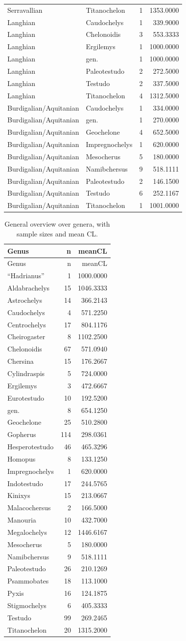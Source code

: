 \documentclass[]{article}
\begin{document}
\begin{longtable}[]{@{}llrr@{}}
Serravallian & Titanochelon & 1 & 1353.0000\tabularnewline
Langhian & Caudochelys & 1 & 339.9000\tabularnewline
Langhian & Chelonoidis & 3 & 553.3333\tabularnewline
Langhian & Ergilemys & 1 & 1000.0000\tabularnewline
Langhian & gen. & 1 & 1000.0000\tabularnewline
Langhian & Paleotestudo & 2 & 272.5000\tabularnewline
Langhian & Testudo & 2 & 337.5000\tabularnewline
Langhian & Titanochelon & 4 & 1312.5000\tabularnewline
Burdigalian/Aquitanian & Caudochelys & 1 & 334.0000\tabularnewline
Burdigalian/Aquitanian & gen. & 1 & 270.0000\tabularnewline
Burdigalian/Aquitanian & Geochelone & 4 & 652.5000\tabularnewline
Burdigalian/Aquitanian & Impregnochelys & 1 & 620.0000\tabularnewline
Burdigalian/Aquitanian & Mesocherus & 5 & 180.0000\tabularnewline
Burdigalian/Aquitanian & Namibchersus & 9 & 518.1111\tabularnewline
Burdigalian/Aquitanian & Paleotestudo & 2 & 146.1500\tabularnewline
Burdigalian/Aquitanian & Testudo & 6 & 252.1167\tabularnewline
Burdigalian/Aquitanian & Titanochelon & 1 & 1001.0000\tabularnewline
\bottomrule
\end{longtable}

\begin{longtable}[]{@{}lrr@{}}
\caption{General overview over genera, with sample sizes and mean
CL.}\tabularnewline
\toprule
Genus & n & meanCL\tabularnewline
\midrule
\endfirsthead
\toprule
Genus & n & meanCL\tabularnewline
\midrule
\endhead
``Hadrianus'' & 1 & 1000.0000\tabularnewline
Aldabrachelys & 15 & 1046.3333\tabularnewline
Astrochelys & 14 & 366.2143\tabularnewline
Caudochelys & 4 & 571.2250\tabularnewline
Centrochelys & 17 & 804.1176\tabularnewline
Cheirogaster & 8 & 1102.2500\tabularnewline
Chelonoidis & 67 & 571.0940\tabularnewline
Chersina & 15 & 176.2667\tabularnewline
Cylindraspis & 5 & 724.0000\tabularnewline
Ergilemys & 3 & 472.6667\tabularnewline
Eurotestudo & 10 & 192.5200\tabularnewline
gen. & 8 & 654.1250\tabularnewline
Geochelone & 25 & 510.2800\tabularnewline
Gopherus & 114 & 298.0361\tabularnewline
Hesperotestudo & 46 & 465.3296\tabularnewline
Homopus & 8 & 133.1250\tabularnewline
Impregnochelys & 1 & 620.0000\tabularnewline
Indotestudo & 17 & 244.5765\tabularnewline
Kinixys & 15 & 213.0667\tabularnewline
Malacochersus & 2 & 166.5000\tabularnewline
Manouria & 10 & 432.7000\tabularnewline
Megalochelys & 12 & 1446.6167\tabularnewline
Mesocherus & 5 & 180.0000\tabularnewline
Namibchersus & 9 & 518.1111\tabularnewline
Paleotestudo & 26 & 210.1269\tabularnewline
Psammobates & 18 & 113.1000\tabularnewline
Pyxis & 16 & 124.1875\tabularnewline
Stigmochelys & 6 & 405.3333\tabularnewline
Testudo & 99 & 269.2465\tabularnewline
Titanochelon & 20 & 1315.2000\tabularnewline
\bottomrule
\end{longtable}
\end{document}
